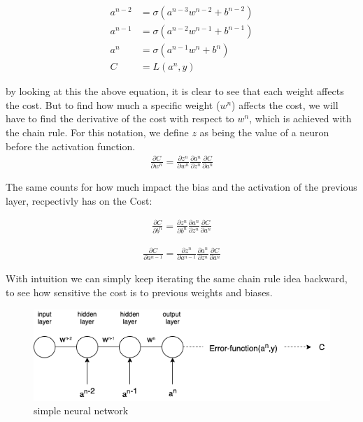\begin{align}
    a^{n-2} &= \sigma(a^{n-3}w^{n-2} + b^{n-2}) \\
    a^{n-1} &= \sigma(a^{n-2}w^{n-1} + b^{n-1})\\
    a^n &= \sigma(a^{n-1}w^n + b^n)\\
    C &= L(a^n, y)
\end{align}

\noindent
by looking at this the above equation, it is clear to see that each weight affects the cost. But to find how much a specific weight ($w^n$) affects the cost, we will have to find the derivative of the cost with respect to $w^n$, which is achieved with the chain rule. For this notation, we define $z$ as being the value of a neuron before the activation function.\\

\begin{align}
\frac{\partial C}{\partial w^n} =\frac{\partial z^n}{\partial w^n}\frac{\partial a^n}{\partial z^n}\frac{\partial C}{  \partial a^n}
\end{align}

\noindent
The same counts for how much impact the bias and the activation of the previous layer, recpectivly has on the Cost:

\begin{align}
\frac{\partial C}{\partial b^n} =\frac{\partial z^n}{\partial b^n}\frac{\partial a^n}{\partial z^n}\frac{\partial C}{  \partial a^n}
\end{align}

\begin{align}
\frac{\partial C}{\partial a^{n-1}} =\frac{\partial z^n}{\partial a^{n-1}}\frac{\partial a^n}{\partial z^n}\frac{\partial C}{  \partial a^n}
\end{align}

\noindent
With intuition we can simply keep iterating the same chain rule idea backward, to see how sensitive the cost is to previous weights and biases. \\

\begin{figure}[!ht]
  \centering
  \includegraphics[scale=0.4]{latex/imgs/simplebackprop.png}
  \caption{simple neural network}\label{Baseline:before}
  \label{fig:simple_layers}
\end{figure}


